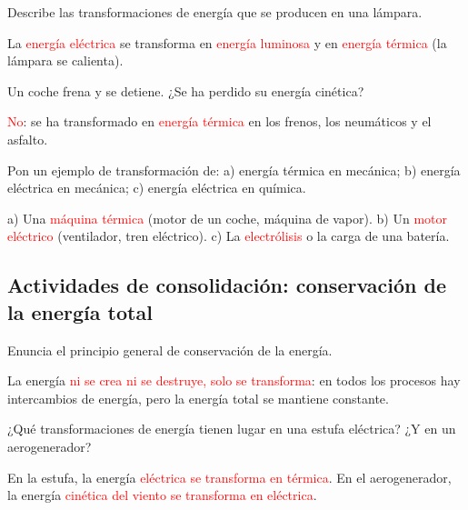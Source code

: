 \begin{exercise}
    Describe las transformaciones de energía que se producen en una lámpara.
    \begin{solu}
        La \textcolor{red}{energía eléctrica} se transforma en \textcolor{red}{energía luminosa} y en \textcolor{red}{energía térmica} (la lámpara se calienta).
    \end{solu}
\end{exercise}

\begin{exercise}
    Un coche frena y se detiene. ¿Se ha perdido su energía cinética?
    \begin{solu}
        \textcolor{red}{No}: se ha transformado en \textcolor{red}{energía térmica} en los frenos, los neumáticos y el asfalto.
    \end{solu}
\end{exercise}

\begin{exercise}
    Pon un ejemplo de transformación de: a) energía térmica en mecánica; b) energía eléctrica en mecánica; c) energía eléctrica en química.
    \begin{solu}
        a) Una \textcolor{red}{máquina térmica} (motor de un coche, máquina de vapor). b) Un \textcolor{red}{motor eléctrico} (ventilador, tren eléctrico). c) La \textcolor{red}{electrólisis} o la carga de una batería.
    \end{solu}
\end{exercise}

\subsection*{Actividades de consolidación: conservación de la energía total}

\begin{exercise}
    Enuncia el principio general de conservación de la energía.
    \begin{solu}
        La energía \textcolor{red}{ni se crea ni se destruye, solo se transforma}: en todos los procesos hay intercambios de energía, pero la energía total se mantiene constante.
    \end{solu}
\end{exercise}

\begin{exercise}
    ¿Qué transformaciones de energía tienen lugar en una estufa eléctrica? ¿Y en un aerogenerador?
    \begin{solu}
        En la estufa, la energía \textcolor{red}{eléctrica se transforma en térmica}. En el aerogenerador, la energía \textcolor{red}{cinética del viento se transforma en eléctrica}.
    \end{solu}
\end{exercise}

